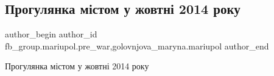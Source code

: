  
 
 
 
 

\subsection{Прогулянка містом у жовтні 2014 року}
\label{sec:09_02_2023.fb.fb_group.mariupol.pre_war.6.progulyanka_m_stom_u}
 
\ifcmt
 author_begin
   author_id fb_group.mariupol.pre_war,golovnjova_maryna.mariupol
 author_end
\fi

Прогулянка містом у жовтні 2014 року

